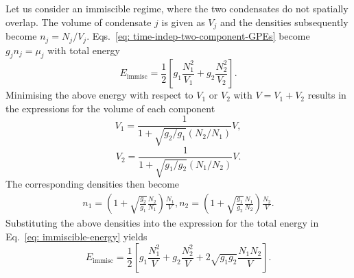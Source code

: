 Let us consider an immiscible regime, where the two condensates do not spatially
overlap.
The volume of condensate \(j\) is given as \(V_j\) and the densities
subsequently become \(n_j=N_j/V_j\).
Eqs.~\eqref{eq: time-indep-two-component-GPEs} become \(g_j n_j = \mu_j\) with
total energy
\begin{equation}\label{eq: immiscible-energy}
    E_\mathrm{immisc} = \frac{1}{2}\left[g_1\frac{N_1^2}{V_1}
    + g_2\frac{N_2^2}{V_2}\right].
\end{equation}
Minimising the above energy with respect to \(V_1\) or \(V_2\) with
\(V=V_1+V_2\) results in the expressions for the volume of each component
\begin{equation}
    V_1 = \frac{1}{1 + \sqrt{g_2/g_1}(N_2/N_1)}V,
\end{equation}
\begin{equation}
    V_2 = \frac{1}{1 + \sqrt{g_1/g_2}(N_1/N_2)}V.
\end{equation}
The corresponding densities then become
\begin{equation}
    \begin{aligned}
        n_1 = \left(1 + \sqrt{\frac{g_2}{g_1}}\frac{N_2}{N_1}\right)
        \frac{N_1}{V},
        n_2 = \left(1 + \sqrt{\frac{g_1}{g_2}}\frac{N_1}{N_2}\right)
        \frac{N_2}{V}.
    \end{aligned}
\end{equation}
Substituting the above densities into the expression for the total energy
in Eq.~\eqref{eq: immiscible-energy} yields
\begin{equation}
    E_\mathrm{immisc} = \frac{1}{2}\left[g_1\frac{N_1^2}{V} + g_2\frac{N_2^2}{V}
    + 2\sqrt{g_1g_2}\frac{N_1N_2}{V}\right].
\end{equation}

